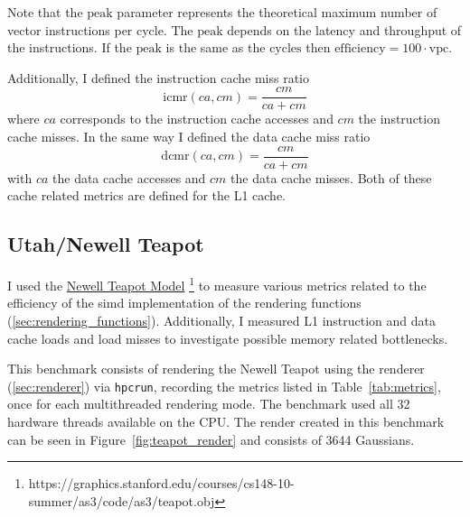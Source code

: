 \documentclass[a4paper, 11pt]{memoir}
\begin{document}
    Note that the $\text{peak}$ parameter represents the theoretical maximum number of vector instructions per cycle. The
    $\text{peak}$ depends on the \gls{latency} and \gls{throughput} of the instructions. If the $\text{peak}$ is the same
    as the $\text{cycles}$ then $\text{efficiency} = 100 \cdot \text{vpc}$.

    Additionally, I defined the instruction cache miss ratio
    \begin{equation}
        \text{icmr}(ca, cm) = \frac{cm}{ca + cm}
    \end{equation}
    where $ca$ corresponds to the instruction cache accesses and $cm$ the instruction cache misses. In the same way I defined
    the data cache miss ratio
    \begin{equation}
        \text{dcmr}(ca, cm) = \frac{cm}{ca + cm}
    \end{equation}
    with $ca$ the data cache accesses and $cm$ the data cache misses. Both of these cache related metrics are defined
    for the L1 cache.

    \subsection{Utah/Newell Teapot}
    \label{sec:utah_teapot}
    I used the \href{https://graphics.stanford.edu/courses/cs148-10-summer/as3/code/as3/teapot.obj}{Newell Teapot Model}
    \footnote{https://graphics.stanford.edu/courses/cs148-10-summer/as3/code/as3/teapot.obj} to measure various metrics
    related to the efficiency of the \gls{simd} implementation of the rendering functions (\ref{sec:rendering_functions}).
    Additionally, I measured L1 instruction and data cache loads and load misses to investigate possible memory related
    bottlenecks.

    This benchmark consists of rendering the Newell Teapot using the renderer (\ref{sec:renderer}) via \texttt{hpcrun},
    recording the metrics listed in Table~\ref{tab:metrics}, once for each multithreaded rendering mode. The benchmark
    used all 32 hardware threads available on the CPU. The render created in this benchmark can be seen in
    Figure~\ref{fig:teapot_render} and consists of 3644 Gaussians.
\end{document}
